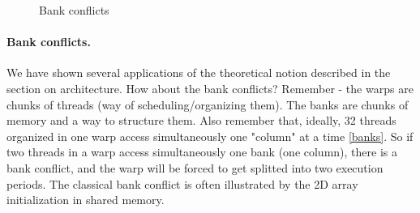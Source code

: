 \documentclass[12pt]{article}
\begin{document}
\begin{figure}[h!]
   \centering
   \qquad
   \caption{Bank conflicts}
   \label{fig:bankconflicts2}
\end{figure}

\paragraph{Bank conflicts.} We have shown several applications of the theoretical notion described in the section 
on architecture. How about the bank conflicts? Remember - the warps are chunks of threads (way of scheduling/organizing them). 
The banks are chunks of memory and a way to structure them. Also remember that, ideally, 32 threads 
organized in one warp access simultaneously one "column" at a time \autoref{banks}. So if two threads in a warp access simultaneously 
one bank (one column), there is a bank conflict, and the warp will be forced to get splitted into two execution periods. 
The classical bank conflict is often illustrated by the 2D array initialization in shared memory. 
\end{document}
